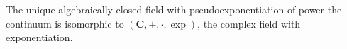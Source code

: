The unique algebraically closed field with pseudoexponentiation of power the continuum is isomorphic to $(\mathbf{C}, +, \cdot, \exp)$, the complex field with exponentiation.
